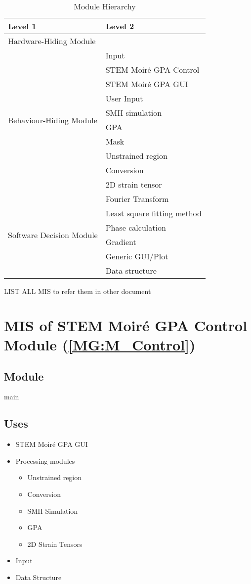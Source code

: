 \documentclass[12pt, titlepage]{article}
\newcommand{\progname}{STEM Moir{\'e} GPA}
\begin{document}
\begin{table}[H]
\centering
\begin{tabular}{p{} p{}}
\toprule
\textbf{Level 1} & \textbf{Level 2}\\
\midrule

{Hardware-Hiding Module} & ~ \\
\midrule

\multirow{10}{0.3\textwidth}{Behaviour-Hiding Module} & Input\\
& \progname{} Control \\
& \progname{} GUI \\
& User Input \\
& SMH simulation \\
& GPA \\
& Mask \\
& Unstrained region \\
& Conversion \\
& 2D strain tensor \\
\midrule

\multirow{6}{0.3\textwidth}{Software Decision Module} & Fourier Transform \\
& Least square fitting method \\
& Phase calculation \\
& Gradient \\
& Generic GUI/Plot \\
& Data structure \\
\bottomrule

\end{tabular}
\caption{Module Hierarchy}
\label{TblMH}
\end{table}

LIST ALL MIS to refer them in other document

\newpage


\section{MIS of STEM Moir{\'e} GPA Control Module (\texorpdfstring{\cref{MG:M_Control}}))} \label{MIS_Control}

\subsection{Module}
main
\subsection{Uses}
\begin{itemize}
\item STEM Moir{\'e} GPA GUI
\item Processing modules \begin{itemize}
	\item Unstrained region 
	\item Conversion
	\item SMH Simulation
	\item GPA
	\item 2D Strain Tensors
\end{itemize}
\item Input
\item Data Structure
\end{itemize}
\end{document}
